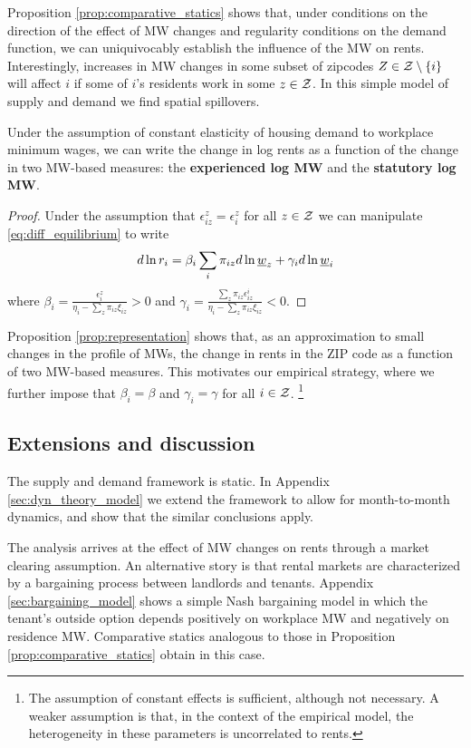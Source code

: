 Proposition \ref{prop:comparative_statics} shows that, under conditions on the 
direction of the effect of MW changes and regularity conditions on the demand 
function, we can uniquivocably establish the influence of the MW on rents. 
Interestingly, increases in MW changes in some subset of zipcodes $Z\in\mathcal{Z}\setminus\{i\}$ 
will affect $i$ if some of $i$'s residents work in some $z\in\mathcal{Z}$.
In this simple model of supply and demand we find spatial spillovers.

\begin{prop}[Representation]\label{prop:representation}
    Under the assumption of constant elasticity of housing demand to workplace minimum 
    wages, we can write the change in log rents as a function of the change in two 
    MW-based measures: the \textbf{experienced log MW} and the \textbf{statutory 
    log MW}.
\end{prop}

\begin{proof}
    Under the assumption that $\epsilon_{iz}^z = \epsilon_i^z$ for all $z\in\mathcal{Z}$ we can 
    manipulate \eqref{eq:diff_equilibrium} to write
    $$
    d \ln r_i = \beta_i \sum_i \pi_{iz} d\ln \underline{w}_z + \gamma_i d \ln \underline{w}_i
    $$
    where $\beta_i = \frac{\epsilon_{i}^z}{\eta_{i} - \sum_z \pi_{iz} \xi_{iz}} 
    >0$ and $\gamma_i = \frac{\sum_z \pi_{iz} \epsilon_{iz}^i}{\eta_{i} 
            - \sum_z \pi_{iz} \xi_{iz}} < 0$.
\end{proof}

Proposition \ref{prop:representation} shows that, as an approximation to small changes in 
the profile of MWs, the change in rents in the ZIP code as a function of two MW-based 
measures.
This motivates our empirical strategy, where we further impose that $\beta_i = \beta$ and 
$\gamma_i=\gamma$ for all $i\in\mathcal{Z}$.%
\footnote{The assumption of constant effects is sufficient, although not necessary. A 
weaker assumption is that, in the context of the empirical model, the heterogeneity in 
these parameters is uncorrelated to rents.}

\subsection{Extensions and discussion}

The supply and demand framework is static.
In Appendix \ref{sec:dyn_theory_model} we extend the framework to allow for 
month-to-month dynamics, and show that the similar conclusions apply.

The analysis arrives at the effect of MW changes on rents through a market clearing
assumption.
An alternative story is that rental markets are characterized by a bargaining process 
between landlords and tenants.
Appendix \ref{sec:bargaining_model} shows a simple Nash bargaining model in which
the tenant's outside option depends positively on workplace MW and negatively on
residence MW.
Comparative statics analogous to those in Proposition \ref{prop:comparative_statics} 
obtain in this case.

